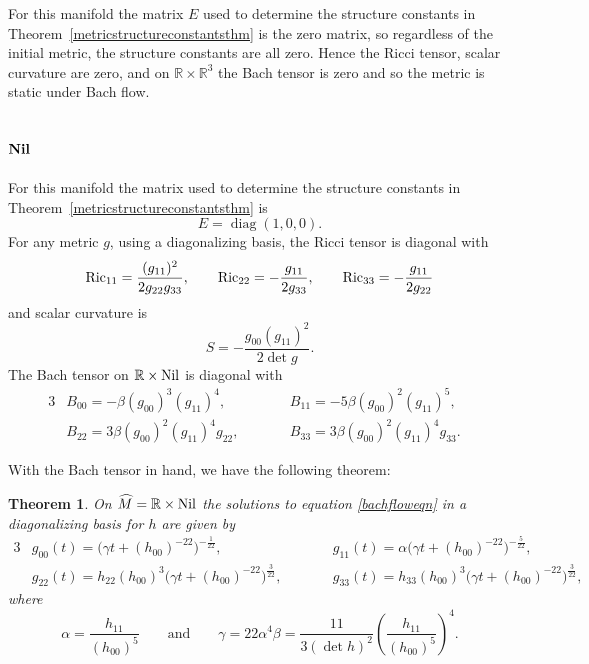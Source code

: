\documentclass[pdftex]{sigma}
\numberwithin{equation}{section}
\newtheorem{Theorem}{Theorem}[section]
\newcommand{\diag}{\operatorname{diag}} %
\begin{document}
For this manifold the matrix $E$ used to determine the structure constants in Theorem~\ref{metricstructureconstantsthm} is the zero matrix, so regardless of the initial metric, the structure constants are all zero. Hence the Ricci tensor, scalar curvature are zero, and on $\mathbb{R} \times \mathbb{R}^3$ the Bach tensor is zero and so the metric is static under Bach flow.

\subsection[${\rm Nil}$]{$\boldsymbol{{\rm Nil}}$}

For this manifold the matrix used to determine the structure constants in Theorem~\ref{metricstructureconstantsthm} is
\[
E = \diag(1, 0, 0).
\]
For any metric $g$, using a diagonalizing basis, the Ricci tensor is diagonal with
\begin{gather*}
{\rm Ric}_{11} = \frac{(g_{11})^2}{2 g_{22} g_{33}},\qquad
{\rm Ric}_{22} = -\frac{g_{11}}{2 g_{33}},\qquad
{\rm Ric}_{33} = -\frac{g_{11}}{2 g_{22}}
\end{gather*}
and scalar curvature is
\[
S = -\frac{g_{00} (g_{11})^2}{2 \det g} .
\]
The Bach tensor on $\mathbb{R} \times {\rm Nil}$ is diagonal with
\begin{alignat*}{3}
& B_{00} = -\beta (g_{00})^3 (g_{11})^4, \qquad &&
B_{11} = -5 \beta (g_{00})^2 (g_{11})^5,&\\
& B_{22} = 3 \beta (g_{00})^2 (g_{11})^4 g_{22}, \qquad &&
B_{33} = 3 \beta (g_{00})^2 (g_{11})^4 g_{33}.&
\end{alignat*}

With the Bach tensor in hand, we have the following theorem:

\begin{Theorem} On $\widehat{M} = \mathbb{R} \times {\rm Nil}$ the solutions to equation \eqref{bachfloweqn} in a diagonalizing basis for $h$ are given by
\begin{alignat*}{3}
& g_{00}(t) = \big(\gamma t + (h_{00})^{-22} \big)^{-\frac{1}{22}}, \qquad &&
g_{11}(t) = \alpha \big(\gamma t + (h_{00})^{-22} \big)^{-\frac{5}{22}},& \\
& g_{22}(t) = h_{22} (h_{00})^{3}
		\big(\gamma t + (h_{00})^{-22} \big)^{\frac{3}{22}}, \qquad &&
g_{33}(t) = h_{33} (h_{00})^{3}
		\big(\gamma t + (h_{00})^{-22} \big)^{\frac{3}{22}},&
\end{alignat*}
where
\[
\alpha = \frac{h_{11}}{(h_{00})^5} \qquad \text{and} \qquad
\gamma = 22 \alpha^4 \beta
		= \frac{11}{3 (\det h)^2} \left(\frac{h_{11}}{(h_{00})^5}\right)^4.
\]
\end{Theorem}
\end{document}
